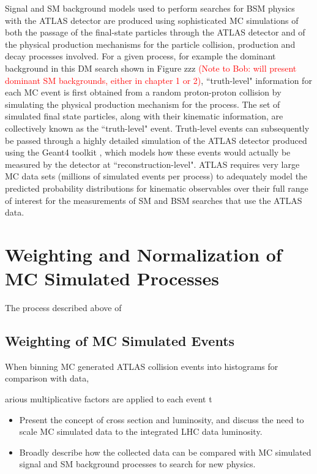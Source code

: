 Signal and SM background models used to perform searches for BSM physics with the ATLAS detector are produced using sophisticated MC simulations of both the passage of the final-state particles through the ATLAS detector and of the physical production mechanisms for the particle collision, production and decay processes involved. For a given process, for example the dominant \wjets background in this DM search shown in Figure zzz \textcolor{red}{(Note to Bob: will present dominant SM backgrounds, either in chapter 1 or 2)}, ``truth-level" information for each MC event is first obtained from a random proton-proton collision by simulating the physical production mechanism for the process. The set of simulated final state particles, along with their kinematic information, are collectively known as the ``truth-level" event. Truth-level events can subsequently be passed through a highly detailed  simulation of the ATLAS detector \cite{atlas_sim} produced using the Geant4 toolkit \cite{Geant4}, which models how these events would actually be measured by the detector at ``reconstruction-level". ATLAS requires very large MC data sets (millions of simulated events per process) to adequately model the predicted probability distributions for kinematic observables over their full range of interest for the measurements of SM and BSM searches that use the ATLAS data.

\section{Weighting and Normalization of MC Simulated Processes}

The process described above of 

\subsection{Weighting of MC Simulated Events}

When binning MC generated ATLAS collision events into histograms for comparison with data, 

arious multiplicative factors are applied to each event t

\begin{itemize}
\item Present the concept of cross section and luminosity, and discuss the need to scale MC simulated data to the integrated LHC data luminosity. 
\item Broadly describe how the collected data can be compared with MC simulated signal and SM background processes to search for new physics.
\end{itemize}

